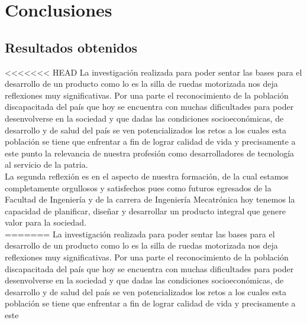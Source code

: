 
\chapter{Conclusiones} %

\label{Chapter5} %




\section{Resultados obtenidos}
<<<<<<< HEAD
La investigaci\'on realizada para poder sentar las bases para el desarrollo de un producto como lo es la silla de ruedas motorizada nos deja reflexiones muy significativas. Por una parte el reconocimiento de la poblaci\'on discapacitada del pa\'is que hoy se encuentra con muchas dificultades para poder desenvolverse en la sociedad y que dadas las condiciones socioecon\'omicas, de desarrollo y de salud del pa\'is se ven potencializados los retos a los cuales esta poblaci\'on se tiene que enfrentar a fin de lograr calidad de vida y precisamente a este punto la relevancia de nuestra profesi\'on como desarrolladores de tecnolog\'ia al servicio de la patria.\\
La segunda reflexi\'on es en el aspecto de nuestra formaci\'on, de la cual estamos completamente orgullosos y satisfechos pues como futuros egresados de la Facultad de Ingenier\'ia y de la carrera de Ingenier\'ia Mecatr\'onica hoy tenemos la capacidad de planificar, diseñar y desarrollar un producto integral que genere valor para la sociedad.\\
=======
La investigaci\'on realizada para poder sentar las bases para el desarrollo de
un producto como lo es la silla de ruedas motorizada nos deja reflexiones muy
significativas. Por una parte el reconocimiento de la poblaci\'on discapacitada
del pa\'is que hoy se encuentra con muchas dificultades para poder desenvolverse
en la sociedad y que dadas las condiciones socioecon\'omicas, de desarrollo y de
salud del pa\'is se ven potencializados los retos a los cuales esta poblaci\'on
se tiene que enfrentar a fin de lograr calidad de vida y precisamente a este
